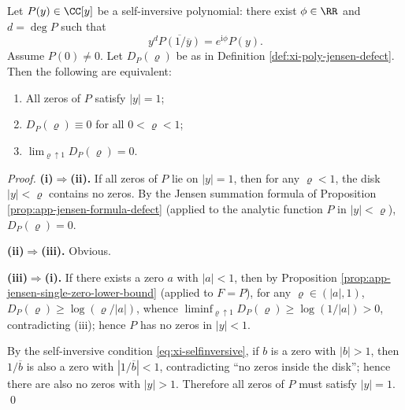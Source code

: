 \begin{theorem}\label{thm:xi-selfinversive-jensen-criterion}
Let \(P(y)\in\CC[y]\) be a self-inversive polynomial: there exist \(\phi\in\RR\) and \(d=\deg P\) such that
\begin{equation}\label{eq:xi-selfinversive}
y^{d}\overline{P(1/\overline{y})}=e^{\mathrm{i}\phi}P(y).
\end{equation}
Assume \(P(0)\neq 0\).
Let \(D_P(\varrho)\) be as in Definition \ref{def:xi-poly-jensen-defect}.
Then the following are equivalent:
\begin{enumerate}
  \item[(i)] All zeros of \(P\) satisfy \(|y|=1\);
  \item[(ii)] \(D_{P}(\varrho)\equiv 0\) for all \(0<\varrho<1\);
  \item[(iii)] \(\displaystyle \lim_{\varrho\uparrow 1}D_{P}(\varrho)=0\).
\end{enumerate}
\end{theorem}

\begin{proof}
\textbf{(i)\(\Rightarrow\)(ii).}
If all zeros of \(P\) lie on \(|y|=1\), then for any \(\varrho<1\), the disk \(|y|<\varrho\) contains no zeros.
By the Jensen summation formula of Proposition \ref{prop:app-jensen-formula-defect} (applied to the analytic function \(P\) in \(|y|<\varrho\)), \(D_P(\varrho)=0\).
\par
\textbf{(ii)\(\Rightarrow\)(iii).} Obvious.
\par
\textbf{(iii)\(\Rightarrow\)(i).}
If there exists a zero \(a\) with \(|a|<1\), then by Proposition \ref{prop:app-jensen-single-zero-lower-bound} (applied to \(F=P\)), for any \(\varrho\in(|a|,1)\),
\(
D_P(\varrho)\ge \log(\varrho/|a|)
\), whence
\(
\liminf_{\varrho\uparrow 1}D_P(\varrho)\ge \log(1/|a|)>0
\), contradicting (iii); hence \(P\) has no zeros in \(|y|<1\).
\par
By the self-inversive condition \eqref{eq:xi-selfinversive}, if \(b\) is a zero with \(|b|>1\), then \(1/\overline{b}\) is also a zero with \(|1/\overline{b}|<1\), contradicting ``no zeros inside the disk''; hence there are also no zeros with \(|y|>1\).
Therefore all zeros of \(P\) must satisfy \(|y|=1\). \qed
\end{proof}

